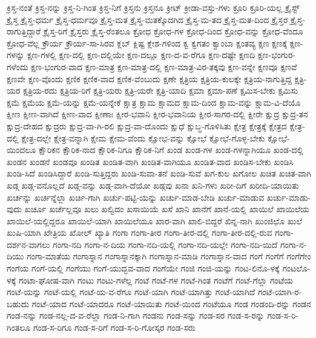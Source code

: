 {ಕ್ರಿಸ್ತ-ನಂತೆ
ಕ್ರಿಸ್ತ-ನನ್ನು
ಕ್ರಿಸ್ತ-ನಿ-ಗಿಂತ
ಕ್ರಿಸ್ತ-ನಿಗೆ
ಕ್ರಿಸ್ತನು
ಕ್ರಿಸ್ತನೂ
ಕ್ರೀಟ್
ಕ್ರೀಡಾ-ವಸ್ತು-ಗಳು
ಕ್ರೂರಿ
ಕ್ರೂರಿ-ಯಲ್ಲ
ಕ್ರೈಸ್ಟ್
ಕ್ರೈಸ್ತ
ಕ್ರೈಸ್ತ-ಧರ್ಮ
ಕ್ರೈಸ್ತ-ಧರ್ಮವೂ
ಕ್ರೈಸ್ತ-ಮತ
ಕ್ರೈಸ್ತ-ಮತಕ್ಕೊದಗಿದ
ಕ್ರೈಸ್ತ-ಮ-ತದ
ಕ್ರೈಸ್ತ-ಮತ-ದಿಂದ
ಕ್ರೈಸ್ತರ
ಕ್ರೈಸ್ತ-ರಾಗುತ್ತಿದ್ದಾರೆ
ಕ್ರೈಸ್ತ-ರಿಗೆ
ಕ್ರೈಸ್ತರು
ಕ್ರೈಸ್ತ-ರೆಂತಲೂ
ಕ್ರೋಧ
ಕ್ರೋಧ-ಗಳ
ಕ್ರೋಧ-ದಿಂದ
ಕ್ರೋಧ-ವನ್ನು
ಕ್ರೋಧ-ವೆಂದೂ
ಕ್ರೋಧ-ವೆಲ್ಲ
ಕ್ರೌರ್ಯ
ಕ್ರೌರ್ಯ-ಸಾ-ಸಿರವ
ಕ್ಲಬ್
ಕ್ಲಿಷ್ಟ
ಕ್ಲೇಶ-ಗಳಿಂದ
ಕ್ವ
ಕ್ವಗತಂ
ಕ್ವಾಂಬಾ
ಕ್ಷಂತವ್ಯ
ಕ್ಷಣ
ಕ್ಷಣಕ್ಕೆ
ಕ್ಷಣ-ಗಳನ್ನು
ಕ್ಷಣ-ಗಳಲ್ಲಿ
ಕ್ಷಣ-ದಲ್ಲಿ
ಕ್ಷಣ-ದಲ್ಲಿಯೇ
ಕ್ಷಣ-ದಲ್ಲೂ
ಕ್ಷಣ-ದ-ವ-ರೆಗೂ
ಕ್ಷಣ-ದಷ್ಟೇ
ಕ್ಷಣದಿ
ಕ್ಷಣ-ಭಂಗುರ-ಗಳೆಂದು
ಕ್ಷಣ-ಭಂಗುರ-ವಾದ
ಕ್ಷಣ-ಮಾತ್ರ
ಕ್ಷಣ-ಮಾತ್ರ-ದಲ್ಲಿ
ಕ್ಷಣ-ಮಾತ್ರ-ವಿರ-ತಕ್ಕವು
ಕ್ಷಣ-ವನ್ನೇ
ಕ್ಷಣವೂ
ಕ್ಷಣವೆ
ಕ್ಷಣವೇ
ಕ್ಷಣ-ವೊಂದು
ಕ್ಷಣಿಕ
ಕ್ಷಣಿಕ-ವಾದ
ಕ್ಷಣಿಕ-ವೆಂಬುದು
ಕ್ಷಣೇ
ಕ್ಷತ್ರಿಯ
ಕ್ಷತ್ರಿಯ-ಕುಲಕ್ಕೇ
ಕ್ಷತ್ರಿಯ-ನಾಗುತ್ತಿದ್ದ
ಕ್ಷತ್ರಿ-ಯರ
ಕ್ಷತ್ರಿಯ-ರದು
ಕ್ಷತ್ರಿಯ-ರಿಗೆ
ಕ್ಷತ್ರಿ-ಯರು
ಕ್ಷತ್ರಿ-ಯರೇ
ಕ್ಷತ್ರಿ-ಯಾದಿ
ಕ್ಷಮಾ
ಕ್ಷಮಾ-ಪಣೆ
ಕ್ಷಮಿಸ-ಬೇಕು
ಕ್ಷಮಿಸು
ಕ್ಷಮೆ
ಕ್ಷಮೆಯ
ಕ್ಷಮೆ-ಯನ್ನು
ಕ್ಷಮೆ-ಯನ್ನೇಕೆ
ಕ್ಷಾತ್ರ
ಕ್ಷಾಮ
ಕ್ಷಾಮದ
ಕ್ಷಾಮ-ದಿಂದ
ಕ್ಷಾಮ-ವನ್ನು
ಕ್ಷಾಮ-ವಿ-ದೆಯೊ
ಕ್ಷೀಣ
ಕ್ಷೀಣ-ವಾಗಿದೆ
ಕ್ಷೀಣ-ವಾದ
ಕ್ಷೀಣಾಃ
ಕ್ಷೀರ-ಭವಾನಿ
ಕ್ಷೀರ-ಭವಾನಿಯ
ಕ್ಷೀರ-ಸಾಗರ-ದಲ್ಲಿ
ಕ್ಷೀರೇ
ಕ್ಷುದ್ರ
ಕ್ಷುದ್ರ-ತನ
ಕ್ಷುದ್ರ-ದೇಹದ
ಕ್ಷುದ್ರರು
ಕ್ಷುದ್ರ-ವಾ-ಗಿ-ರಲಿ
ಕ್ಷುದ್ರ-ವಾ-ದೊಂದು
ಕ್ಷುಧೆ
ಕ್ಷುಬ್ಧ-ಗೊಳಿಸಿತು
ಕ್ಷೇತ್ರ
ಕ್ಷೇತ್ರಕ್ಕೆ
ಕ್ಷೇತ್ರದ
ಕ್ಷೇತ್ರ-ದಲ್ಲಿ
ಕ್ಷೇತ್ರ-ದಲ್ಲೇ
ಕ್ಷೇತ್ರ-ವನ್ನಾಗಿ
ಕ್ಷೇಮ
ಕ್ಷೇಮ-ವೆಂದು
ಕ್ಷೋಭ-ವನ್ನು
ಕ್ಷೋಭೆ
ಕ್ಷೋಭೆ-ಗೊಳ್ಳ-ಬೇಕು
ಕ್ಷೋಭೆ-ಯಿಂದಲೂ
ಕ್ಷೌರಿಕನ
ಕ್ಷೌರಿಕ-ನಾದ
ಕ್ಷೌರಿಕ-ನಿಗೂ
ಕ್ಷೌರಿಕ-ನಿಗೆ
ಖಂಡ
ಖಂಡ-ಗಳ
ಖಂಡ-ಗಳನ್ನಾಗಿಯೂ
ಖಂಡ-ದಲ್ಲಿ
ಖಂಡನ
ಖಂಡನೆ
ಖಂಡವೂ
ಖಂಡಿತ
ಖಂಡಿತ-ವಾಗಿ
ಖಂಡಿತ-ವಾಗಿಯೂ
ಖಂಡಿತ-ವಾದ
ಖಂಡಿಸ-ಬೇಕು
ಖಂಡಿಸಿ
ಖಂಡಿ-ಸಿದೆ
ಖಂಡಿಸಿದ್ದಾರೆ
ಖಂಡಿ-ಸುತ್ತಿದ್ದರು
ಖಂಡಿ-ಸುವಾ-ತನೆ
ಖಂಡಿ-ಸುವೆ
ಖಗ-ಕುಲ
ಖಗೋಲ
ಖಚಿತ
ಖಚಿತ-ವಾಗಿ
ಖಡ್ಗ
ಖಡ್ಗ-ವನೊಲ್ಲದೆ
ಖಡ್ಗ-ವನ್ನು
ಖಡ್ಗ-ವಾಗಿ-ದೆಯೋ
ಖಡ್ಗವು
ಖನಾ
ಖನಿ-ಗಳು
ಖರೀ-ದಿಗೆ
ಖರೀದಿ-ಯಾಯಿತು
ಖರ್ಚನ್ನು
ಖರ್ಚನ್ನೆಲ್ಲಾ
ಖರ್ಚಿ-ಗಾಗಿ
ಖರ್ಚು-ಪಟ್ಟಿ-ಯನ್ನು
ಖರ್ಚು-ಮಾಡ-ಬೇಡಿ
ಖರ್ಚು-ಮಾಡುವ
ಖರ್ಚು-ಮಾಡು-ವುದು
ಖರ್ಚೂ
ಖರ್ಚೆಲ್ಲವೂ
ಖಲು
ಖಲ್ವಿದಂ
ಖಸಾಯಿಯೆ
ಖಸೆ
ಖಾನಿ
ಖಾನೆಗೆ
ಖಾನೆ-ಯಲ್ಲಿ
ಖಾಯಿಲೆ
ಖಾಯಿಲೆಯ
ಖಾಯಿಲೆ-ಯಲ್ಲಿದ್ದರೂ
ಖಾಯಿಲೆ-ಯಾಗಿ
ಖಾಯಿಲೆಯೂ
ಖಾರ-ವಾಗಿ
ಖಾಲಿ-ಬಿದ್ದರೆ
ಖಿನ್ನ-ನಾಗಿ
ಖುಂಜಿಛೊ
ಖುಲೆ
ಖುಷಿ-ಯಾಗಿ
ಖೇತ್ರಿಯ
ಖೋಲ್
ಖ್ಯಾತಿ
ಗಂಗಾ
ಗಂಗಾ-ತೀರ
ಗಂಗಾ-ತೀರ-ದಲ್ಲಿ
ಗಂಗಾ-ತೀರ-ದಲ್ಲಿ-ರುವ
ಗಂಗಾ-ದರ್ಶನ-ವಾಗಲು
ಗಂಗಾ-ನದಿ
ಗಂಗಾ-ನ-ದಿಯ
ಗಂಗಾ-ನದಿ-ಯಲ್ಲಿ
ಗಂಗಾ-ನದಿ-ಯಲ್ಲೇ
ಗಂಗಾ-ನದಿ-ಯಿದೆ
ಗಂಗಾ-ನ-ದಿಯು
ಗಂಗಾ-ಮಾತೆಯ
ಗಂಗಾಸ್ನಾನ
ಗಂಗಾಸ್ನಾನಕ್ಕಾಗಿ
ಗಂಗಾಸ್ನಾನ-ಮಾಡಿ
ಗಂಗಾಸ್ನಾನ-ವಾದ
ಗಂಗೆ
ಗಂಗೆಗೆ
ಗಂಗೆಗೇಂ
ಗಂಗೆಯ
ಗಂಗೆ-ಯಲ್ಲಿ
ಗಂಗೆಯು
ಗಂಗೆ-ಯುದ್ಭವ-ವಾದ
ಗಂಗೆಯೇ
ಗಂಜಿ
ಗಂಜಿ-ಯನ್ನು
ಗಂಟ-ಲಿನೊ-ಳಕ್ಕೆ
ಗಂಟಲೊ-ಳಕ್ಕೆ
ಗಂಟಾ-ಘೋಷ-ವಾಗಿ
ಗಂಟು
ಗಂಟು-ಗಳೆಲ್ಲ
ಗಂಟೆ
ಗಂಟೆ-ಗಳ
ಗಂಟೆ-ಗಿಂತ
ಗಂಟೆಗೆ
ಗಂಟೆ-ಗೆಲ್ಲಾ
ಗಂಟೆಯ
ಗಂಟೆ-ಯನ್ನು
ಗಂಟೆ-ಯಲ್ಲಿ
ಗಂಟೆ-ಯ-ವ-ರೆಗೂ
ಗಂಟೆ-ಯಾಗಿ
ಗಂಟೆ-ಯಾಗಿತ್ತು
ಗಂಟೆ-ಯಾಗಿದೆ
ಗಂಟೆ-ಯಾಗಿ-ರ-ಬಹುದು
ಗಂಟೆ-ಯಾದ
ಗಂಟೆ-ಯಾದರೂ
ಗಂಟೆ-ಯಾಯಿತು
ಗಂಟೆ-ಯಿಂದ
ಗಂಟೆಯೂ
ಗಂಡ
ಗಂಡಂದಿ-ರನ್ನು
ಗಂಡನ
ಗಂಡ-ನನ್ನು
ಗಂಡ-ನಲ್ಲ-ದ-ವ-ರೆಲ್ಲಾ
ಗಂಡ-ನಿ-ಗಾಗಿ
ಗಂಡನು
ಗಂಡ-ಸನ್ನು
ಗಂಡ-ಸರ
ಗಂಡ-ಸ-ರನ್ನು
ಗಂಡ-ಸ-ರಿ-ಗಿಂತಲೂ
ಗಂಡ-ಸ-ರಿಗೂ
ಗಂಡ-ಸ-ರಿಗೆ
ಗಂಡ-ಸ-ರಿ-ಗೋಸ್ಕರ
ಗಂಡ-ಸರು
}
